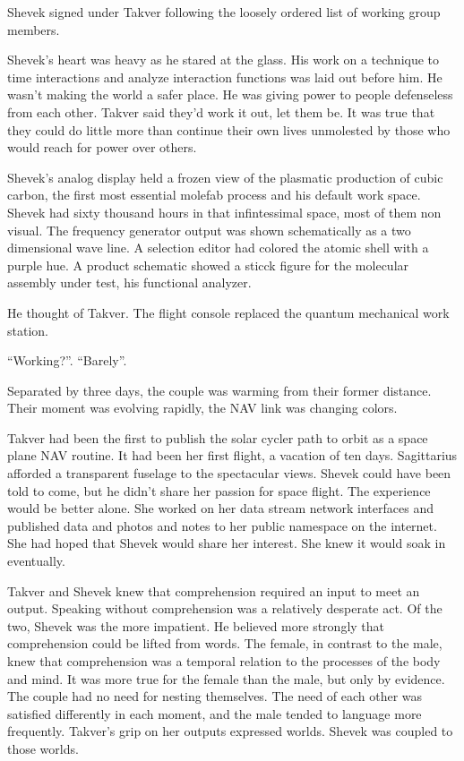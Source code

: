 Shevek signed under Takver following the loosely ordered list of
working group members.

Shevek's heart was heavy as he stared at the glass.  His work on a
technique to time interactions and analyze interaction functions was
laid out before him.  He wasn't making the world a safer place.  He
was giving power to people defenseless from each other.  Takver said
they'd work it out, let them be.  It was true that they could do
little more than continue their own lives unmolested by those who
would reach for power over others.

Shevek's analog display held a frozen view of the plasmatic production
of cubic carbon, the first most essential molefab process and his
default work space.  Shevek had sixty thousand hours in that
infintessimal space, most of them non visual.  The frequency generator
output was shown schematically as a two dimensional wave line.  A
selection editor had colored the atomic shell with a purple hue.  A
product schematic showed a sticck figure for the molecular assembly
under test, his functional analyzer.

He thought of Takver.  The flight console replaced the quantum
mechanical work station. 

``Working?''.  ``Barely''.

Separated by three days, the couple was warming from their former
distance.  Their moment was evolving rapidly, the NAV link was
changing colors.

Takver had been the first to publish the solar cycler path to orbit as
a space plane NAV routine.  It had been her first flight, a vacation
of ten days.  Sagittarius afforded a transparent fuselage to the
spectacular views.  Shevek could have been told to come, but he didn't
share her passion for space flight.  The experience would be better
alone.  She worked on her data stream network interfaces and published
data and photos and notes to her public namespace on the internet.
She had hoped that Shevek would share her interest.  She knew it would
soak in eventually.

Takver and Shevek knew that comprehension required an input to meet an
output.  Speaking without comprehension was a relatively desperate
act.  Of the two, Shevek was the more impatient.  He believed more
strongly that comprehension could be lifted from words.  The female,
in contrast to the male, knew that comprehension was a temporal
relation to the processes of the body and mind.  It was more true for
the female than the male, but only by evidence.  The couple had no
need for nesting themselves.  The need of each other was satisfied
differently in each moment, and the male tended to language more
frequently.  Takver's grip on her outputs expressed worlds.  Shevek
was coupled to those worlds.

